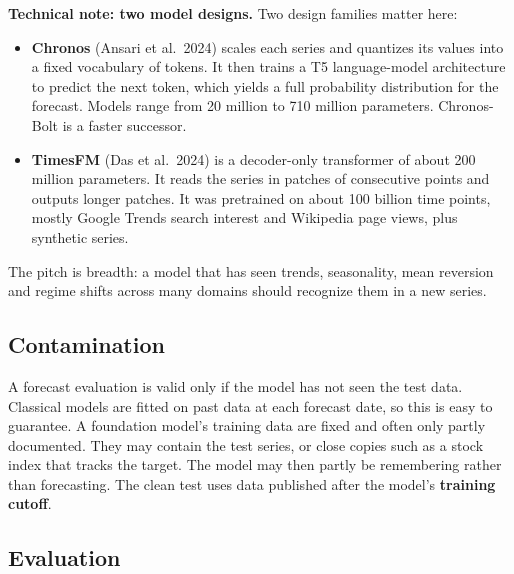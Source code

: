 \begin{technote}
\textbf{Technical note: two model designs.} Two design families matter here:

\begin{itemize}
  \item \textbf{Chronos} (Ansari et al.\ 2024) scales each series and quantizes its values into a fixed vocabulary of tokens. It then trains a T5 language-model architecture to predict the next token, which yields a full probability distribution for the forecast. Models range from 20 million to 710 million parameters. Chronos-Bolt is a faster successor.
  \item \textbf{TimesFM} (Das et al.\ 2024) is a decoder-only transformer of about 200 million parameters. It reads the series in patches of consecutive points and outputs longer patches. It was pretrained on about 100 billion time points, mostly Google Trends search interest and Wikipedia page views, plus synthetic series.
\end{itemize}
\end{technote}

The pitch is breadth: a model that has seen trends, seasonality, mean reversion and regime shifts across many domains should recognize them in a new series.

\subsection{Contamination}
\label{sec:21-contam}

A forecast evaluation is valid only if the model has not seen the test data. Classical models are fitted on past data at each forecast date, so this is easy to guarantee. A foundation model's training data are fixed and often only partly documented. They may contain the test series, or close copies such as a stock index that tracks the target. The model may then partly be remembering rather than forecasting. The clean test uses data published after the model's \textbf{training cutoff}.

\subsection{Evaluation}

